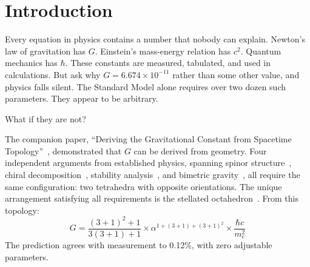 \documentclass[aps,prd,preprint,superscriptaddress,showpacs,preprintnumbers,amsmath,amssymb,nofootinbib]{revtex4-2}
\begin{document}


\maketitle

\section{Introduction}
\label{sec:intro}

Every equation in physics contains a number that nobody can explain. Newton's law of gravitation has $G$. Einstein's mass-energy relation has $c^2$. Quantum mechanics has $\hbar$. These constants are measured, tabulated, and used in calculations. But ask why $G = 6.674 \times 10^{-11}$ rather than some other value, and physics falls silent. The Standard Model alone requires over two dozen such parameters. They appear to be arbitrary.

What if they are not?

The companion paper, ``Deriving the Gravitational Constant from Spacetime Topology''~\cite{paper6}, demonstrated that $G$ can be derived from geometry. Four independent arguments from established physics, spanning spinor structure~\cite{weinberg1995,geroch1968}, chiral decomposition~\cite{ashtekar1986}, stability analysis~\cite{alexander2014}, and bimetric gravity~\cite{hassan2012}, all require the same configuration: two tetrahedra with opposite orientations. The unique arrangement satisfying all requirements is the stellated octahedron~\cite{coxeter1973}. From this topology:
\begin{equation}
G = \frac{(3+1)^2 + 1}{3(3+1) + 1} \times \alpha^{1+(3+1)+(3+1)^2} \times \frac{\hbar c}{m_e^2}
\label{eq:G}
\end{equation}
The prediction agrees with measurement to 0.12\%, with zero adjustable parameters.
\end{document}
